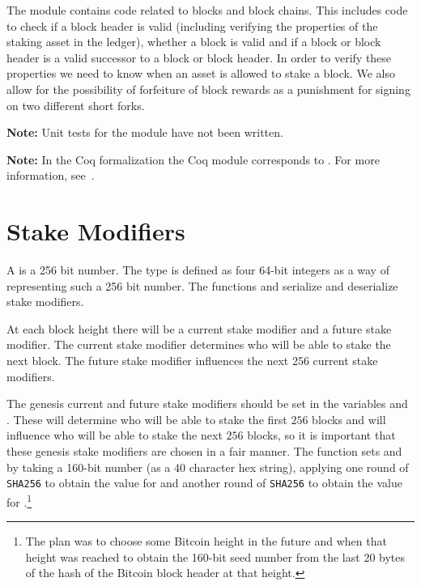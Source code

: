 The module {}
contains code related to blocks and block chains.
This includes code to check if a block header is valid
(including verifying the properties of the staking asset in the ledger),
whether a block is valid
and if a block or block header is a valid successor to a block or block header.
In order to verify these properties we need to know when an asset
is allowed to stake a block.
We also allow for the possibility of forfeiture of block rewards as
a punishment for signing on two different short forks.

{\bf{Note:}} Unit tests for the {} module have not been written.

{\bf{Note:}} 
In the Coq formalization the Coq module {}
corresponds to {}.
For more information, see~\cite{White2015b}.

\section{Stake Modifiers}

A {} is a 256 bit number.
The type {} is defined as four 64-bit integers
as a way of representing such a 256 bit number.
The functions {} and {}
serialize and deserialize stake modifiers.

At each block height there will be a current stake modifier and a future stake modifier.
The current stake modifier determines who will be able to stake the next block.
The future stake modifier influences the next 256 current stake modifiers.

The genesis current and future stake modifiers should be set in the variables
{} and
{}.
These will determine who will be able to stake the first $256$ blocks
and will influence who will be able to stake the next $256$ blocks,
so it is important that these genesis stake modifiers are chosen in a fair manner.
The function {}
sets {}
and {}
by taking a 160-bit number (as a 40 character hex string),
applying one round of {\tt{SHA256}} to obtain the value for
{}
and another round of {\tt{SHA256}} to obtain the value for
{}.\footnote{The plan was to choose some Bitcoin height in the future and when that height was reached to obtain the 160-bit seed number from the last 20 bytes of the hash of the Bitcoin block header at that height.}

